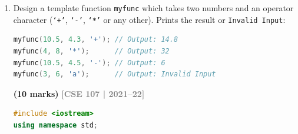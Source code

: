\documentclass[12pt,a3paper]{article}
\newcommand{\yr}[1]{\hfill\textcolor{gray}{\small\textbf{[#1]}}}
\newcommand{\mk}[1]{\textcolor{orange!70!black}{\small\textbf{(#1 marks)}}}
\begin{document}
\begin{enumerate}
\begin{tcolorbox}
\textbf{Why generic functions are more restrictive:}
\begin{enumerate}[label=\textbf{\arabic*.}]
  \item \textbf{Same logic for all types:} A generic function
    applies \emph{identical} operations to all types.  If different
    types require different logic (e.g.\ comparing strings vs ints
    differently), overloading is needed.
  \item \textbf{Operator availability:} The template body assumes
    operations like \texttt{+}, \texttt{<}, etc.\ are defined for
    the type.  If a user-defined type does not support them, the
    template fails to compile.
  \item \textbf{No type-specific specialisation by default:} To get
    different behaviour per type, you must write a \emph{template
    specialisation} --- which is essentially overloading again.
\end{enumerate}

\textbf{Counterpoint:} Generic functions \emph{reduce} restriction in
the sense that a single template handles any compatible type without
writing multiple overloads.

\textbf{Conclusion:} Generic functions are more restrictive
\emph{in the sense} that they force all instantiated types to support
the same operations and produce the same algorithmic behaviour.
Overloaded functions allow per-type customisation.

\end{tcolorbox}


\item Design a template function \texttt{myfunc} which takes two numbers and an operator character (\texttt{`+'}, \texttt{`-'}, \texttt{`*'} or any other). Prints the result or \texttt{Invalid Input}:
\begin{lstlisting}[language=C++]
myfunc(10.5, 4.3, '+'); // Output: 14.8
myfunc(4, 8, '*');      // Output: 32
myfunc(10.5, 4.5, '-'); // Output: 6
myfunc(3, 6, 'a');      // Output: Invalid Input
\end{lstlisting}
\mk{10}
\yr{CSE 107 | 2021--22}
\begin{tcolorbox}[enhanced,breakable,ansbox,colback=cH!4,colframe=cH,
  boxrule=0.8pt,arc=5pt,
  title={\textbf{Answer --- Template function myfunc with operator char}},
  fonttitle=\bfseries\color{white},colbacktitle=cH]

\begin{lstlisting}[language=C++]
#include <iostream>
using namespace std;


\end{lstlisting}
\end{tcolorbox}
\end{enumerate}
\end{document}
